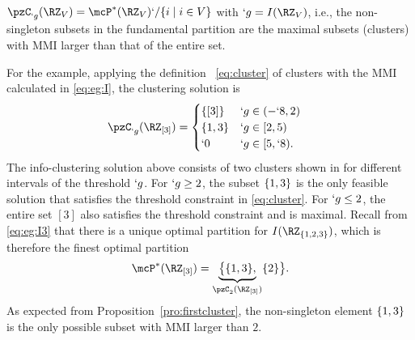 \documentclass[conference,letterpaper]{IEEEtran}
\begin{document}
\begin{Proposition}
\label{pro:firstcluster}
  $\pzC_{`g}(\RZ_V)=\mcP^*(\RZ_V)`/\Set{i\mid i\in V}$ with $`g=I(\RZ_V)$, i.e., the non-singleton subsets in the fundamental partition are the maximal subsets (clusters) with MMI larger than that of the entire set.
\end{Proposition}
For the example, applying the definition
~\eqref{eq:cluster} of clusters with the MMI calculated in \eqref{eq:eg:I}, the clustering solution is
\begin{align}
	\label{eq:eg:clusters}
	\pzC_{`g}(\RZ_{[3]})&=
	\begin{cases}
	\Set{[3]} & `g\in (-`8,2)\\ %
	\Set{1,3} & `g\in [2,5)\\ %
	`0 & `g\in [5,`8).
	\end{cases}
\end{align}
The info-clustering solution above consists of two clusters shown in  for different intervals of the threshold $`g$. For $`g\geq 2$, the subset $\{1,3\}$ is the only feasible solution that satisfies the threshold constraint in \eqref{eq:cluster}. For $`g\leq 2$, the entire set $[3]$ also satisfies the threshold constraint and is maximal. Recall from \eqref{eq:eg:I3} that there is a unique optimal partition for $I(\RZ_{\Set{1,2,3}})$, which is therefore the finest optimal partition
\begin{align}
  \mcP^*(\RZ_{[3]}) = \underbrace{\big\{\Set {1,3},}_{\pzC_{2}(\RZ_{[3]})} \Set {2}\big\}.
\end{align}
As expected from Proposition~\ref{pro:firstcluster}, the non-singleton element $\{1,3\}$ is the only possible subset with MMI larger than $2$.
\end{document}
